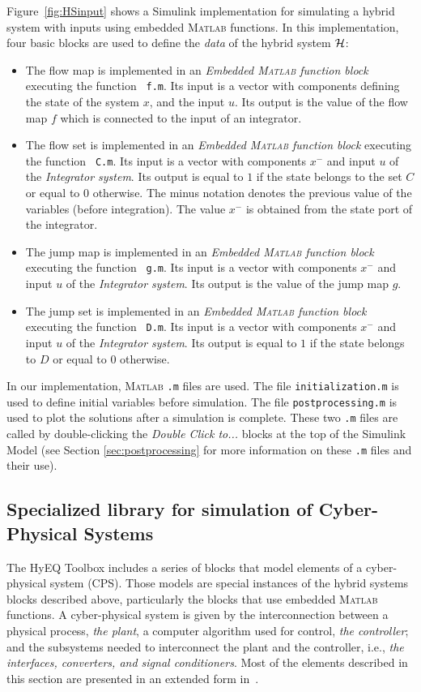 \documentclass{article}
\newcommand{\matlab}{\textsc{Matlab}}
\begin{document}
Figure~\ref{fig:HSinput} shows a Simulink implementation for simulating 
a hybrid system with inputs using embedded \matlab{} functions. 
In this implementation, four basic blocks are used to define the {\em data} 
of the hybrid system $\mathcal{H}$:
\begin{itemize}
\item The flow map is implemented in an {\em Embedded \matlab{} function block} 
executing the function {\tt
f.m}. Its input is a vector with components defining the state of the system $x$, and the input $u$.
Its output is the value of the flow map $f$ which is connected to the  input of an integrator.
\item The flow set is implemented in an {\em Embedded \matlab{} function block} 
executing the function {\tt
C.m}. Its input is a vector with components $x^-$ and input $u$ of the {\em Integrator system}. 
Its output is equal to $1$ if the state belongs to the set $C$ or equal to $0$ otherwise.
The minus notation denotes the previous value of the variables (before integration). 
The value $x^-$ is obtained from the state port of the integrator.
\item The jump map is implemented in an {\em Embedded \matlab{} function block} 
executing the function {\tt
g.m}. Its input is a vector with components $x^-$ and input $u$ of the {\em Integrator system}. 
Its output is the value of the jump map $g$.
\item The jump set is implemented in an {\em Embedded \matlab{} function block} 
executing the function {\tt
D.m}. Its input is a vector with components $x^-$ and input $u$ of the {\em Integrator system}. 
Its output is equal to $1$ if the state belongs to $D$ or equal to $0$ otherwise.
\end{itemize}


In our implementation, \matlab{} {\tt .m} files are used. 
The file {\tt initialization.m} is used to define initial variables before simulation. 
The file {\tt postprocessing.m} is used to plot the solutions after a simulation is complete. 
These two {\tt .m} files are called by double-clicking the {\em Double Click to...} 
blocks at the top of the Simulink Model (see Section \ref{sec:postprocessing} 
for more information on these {\tt .m} files and their use).


\subsection{Specialized library for simulation of Cyber-Physical Systems}
\label{sec:CPS}
The HyEQ Toolbox includes a series of blocks that model elements 
of a cyber-physical system (CPS). Those models are special instances 
of the hybrid systems blocks described above, particularly the blocks 
that use embedded \matlab{} functions.
A cyber-physical system is given by the interconnection between a physical process, 
{\em the plant}, a computer algorithm used for control, {\em the controller}; 
and  the subsystems needed to interconnect the plant and the controller, i.e., 
{\em the interfaces,  converters, and signal conditioners}. 
Most of the elements described in this section are presented in an extended form in~\cite{San17}.
\end{document}
